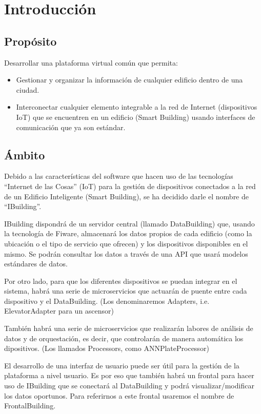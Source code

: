 \documentclass[12pt, a4paper, twoside]{article}
\begin{document}

\newpage
\tableofcontents

\section{Introducción}
\subsection{Propósito}
Desarrollar una plataforma virtual común que permita:
\begin{itemize}
  \item Gestionar y organizar la información de cualquier edificio 
        dentro de una ciudad.
  \item Interconectar cualquier elemento integrable a la red de Internet 
        (dispositivos IoT) que se encuentren en un edificio (Smart Building)
        usando interfaces de comunicación que ya son estándar.
\end{itemize}

\subsection{Ámbito}
Debido a las características del software que hacen uso de las tecnologías 
``Internet de las Cosas'' (IoT) para la gestión de dispositivos conectados a
la red de un Edificio Inteligente (Smart Building), se ha decidido darle el nombre de
``IBuilding''.

IBuilding dispondrá de un servidor central (llamado DataBuilding) que, usando la tecnología
de Fiware, almacenará los datos propios de cada edificio (como la ubicación o el 
tipo de servicio que ofrecen) y los dispositivos disponibles en el mismo. 
Se podrán consultar los datos a través de una API que usará modelos estándares 
de datos.

Por otro lado, para que los diferentes dispositivos se puedan integrar en el sistema,
habrá una serie de microservicios que actuarán de puente entre cada dispositivo
y el DataBuilding. (Los denominaremos Adapters, i.e. ElevatorAdapter para un ascensor)

También habrá una serie de microservicios que realizarán labores de análisis
de datos y de orquestación, es decir, que controlarán de manera automática 
los dipositivos. (Los llamados Processors, como ANNPlateProcessor)

El desarrollo de una interfaz de usuario puede ser útil para la gestión de la plataforma
a nivel usuario. Es por eso que también habrá un frontal para hacer uso de IBuilding
que se conectará al DataBuilding y podrá visualizar/modificar los datos oportunos.
Para referirnos a este frontal usaremos el nombre de FrontalBuilding.
\end{document}
